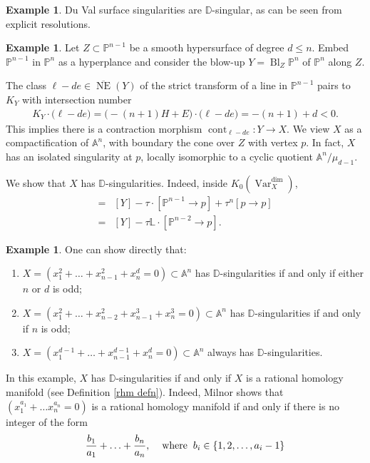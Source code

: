 \documentclass{amsart}
\theoremstyle{definition}
\newtheorem{exmp}[thm]{Example}
\DeclareMathOperator{\Var}{Var}
\DeclareMathOperator{\Bl}{Bl}
\DeclareMathOperator{\NE}{NE}
\DeclareMathOperator{\cont}{cont}
\numberwithin{equation}{section}
\begin{document}
\begin{exmp}
Du Val surface singularities are $\mathbb{D}$-singular, as can be seen from explicit resolutions.
\end{exmp}

\begin{exmp}
Let $Z \subset \mathbb{P}^{n-1}$ be a smooth hypersurface of degree $d \leq n$. Embed $\mathbb{P}^{n-1}$ in $\mathbb{P}^n$ as a hyperplance and consider the blow-up $Y = \Bl_Z \mathbb{P}^n$ of $\mathbb{P}^n$ along $Z$.

The class $\ell-d e \in \overline{\NE}(Y)$ of the strict transform of a line in $\mathbb{P}^{n-1}$ pairs to $K_Y$ with intersection number
\begin{align*}
    K_Y \cdot \big(\ell-d e \big) = \big(-(n+1)H+E \big) \cdot \big(\ell  - d e \big) = -(n+1) + d < 0.
\end{align*}
This implies there is a contraction morphism $\cont_{\ell- d e}: Y \rightarrow X$. We view $X$ as a compactification of $\mathbb{A}^n$, with boundary the cone over $Z$ with vertex $p$. In fact, $X$ has an isolated singularity at $p$, locally isomorphic to a cyclic quotient $\mathbb{A}^n / \mu_{d-1}$.

We show that $X$ has $\mathbb{D}$-singularities. Indeed, inside $K_0(\Var_X^{\dim})$,
\begin{align*}
    [X] =& [Y] - \tau \cdot [\mathbb{P}^{n-1} \rightarrow p] + \tau^n [p \rightarrow p] \\
    =& [Y] - \tau \mathbb{L} \cdot [\mathbb{P}^{n-2} \rightarrow p].
\end{align*}
\end{exmp}

\begin{exmp}\label{rhm example}
One can show directly that:
\begin{enumerate}
    \item $X = ( x_1^2 + \ldots + x_{n-1}^2 + x_n^d = 0 ) \subset \mathbb{A}^n$ has $\mathbb{D}$-singularities if and only if either $n$ or $d$ is odd;
    \item $X = ( x_1^2 + \ldots + x_{n-2}^2 + x_{n-1}^3 + x_n^3 = 0 ) \subset \mathbb{A}^n$ has $\mathbb{D}$-singularities if and only if $n$ is odd;
    \item $X = ( x_1^{d-1} + \ldots + x_{n-1}^{d-1} + x_n^d = 0 ) \subset \mathbb{A}^n$ always has $\mathbb{D}$-singularities.
\end{enumerate}

In this example, $X$ has $\mathbb{D}$-singularities if and only if $X$ is a rational homology manifold (see Definition \ref{rhm defn}). Indeed, Milnor \cite[Sections $7$ and $8$]{milnor} shows that $(x_1^{a_1} + \ldots x_n^{a_n} = 0)$ is a rational homology manifold if and only if there is no integer of the form 
\begin{align*}
    \frac{b_1}{a_1} + \ldots + \frac{b_n}{a_n}, \hspace{.4cm} \mathrm{where} \hspace{.2cm} b_i \in \{ 1, 2,  \ldots , a_i-1 \}
\end{align*}
\end{exmp}
\end{document}
